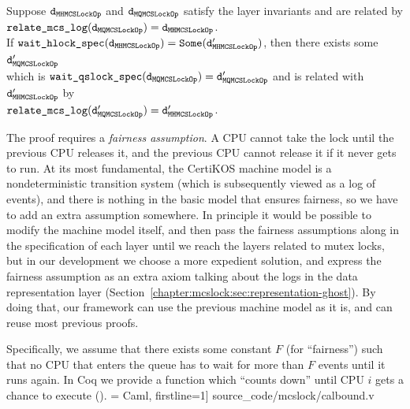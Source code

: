 \begin{theorem}
  \label{thm:chapter:mcslock:mcs_wait_lock_exist}

  Suppose ${\mathrm{\texttt{{d}}}}_{{\mathrm{\texttt{{MHMCSLockOp}}}}}$ and ${\mathrm{\texttt{{d}}}}_{{\mathrm{\texttt{{MQMCSLockOp}}}}}$ satisfy the layer
  invariants and are related by\\
   ${\mathrm{\texttt{{relate\_mcs\_log}}}}({\mathrm{\texttt{{d}}}}_{{\mathrm{\texttt{{{MQMCSLockOp}}}}}}) = 
  {\mathrm{\texttt{{d}}}}_{{\mathrm{\texttt{{MHMCSLockOp}}}}}$.\\
If ${\mathrm{\texttt{{wait\_hlock\_spec}}}}({\mathrm{\texttt{{d}}}}_{{\mathrm{\texttt{{MHMCSLockOp}}}}}) = {\mathrm{\texttt{{Some}}}}({\mathrm{\texttt{{d}}}}'_{{\mathrm{\texttt{{MHMCSLockOp}}}}})$, then there exists some ${\mathrm{\texttt{{d}}}}'_{{\mathrm{\texttt{{MQMCSLockOp}}}}}$\\
  which is ${\mathrm{\texttt{{wait\_qslock\_spec}}}}({\mathrm{\texttt{{d}}}}_{{\mathrm{\texttt{{MQMCSLockOp}}}}}) = {\mathrm{\texttt{{d}}}}'_{{\mathrm{\texttt{{MQMCSLockOp}}}}}$ and is related with ${\mathrm{\texttt{{d}}}}'_{{\mathrm{\texttt{{MHMCSLockOp}}}}}$
   by\\
 ${\mathrm{\texttt{{relate\_mcs\_log}}}}({\mathrm{\texttt{{d}}}}'_{{\mathrm{\texttt{{MQMCSLockOp}}}}}) = {\mathrm{\texttt{{d}}}}'_{{\mathrm{\texttt{{MHMCSLockOp}}}}}$.

\end{theorem}

The proof  requires a \emph{fairness assumption}.
A CPU cannot take the lock until the previous CPU releases it, 
and the previous CPU cannot release it if it never gets to run. 
At its most fundamental, the CertiKOS machine model is a nondeterministic 
transition system (which is subsequently viewed as a log of events), 
and there is nothing in the basic model that ensures fairness, 
so we have to add an extra assumption somewhere. In principle it would be 
possible to modify the machine model itself, and then pass the fairness assumptions 
along in the specification of each layer until we reach the layers related to mutex locks, 
but in our development we choose a more expedient solution, and express
the fairness assumption as an extra axiom talking about the logs 
in the data representation layer (Section~\ref{chapter:mcslock:sec:representation-ghost}). 
By doing that, our framework can use the previous machine 
model as it is, and can reuse most previous proofs.

Specifically, we assume that there exists some constant $F$ (for ``fairness'') such that no CPU that enters the queue has to wait for more than $F$ events until it runs again. 
In Coq we provide a function  which ``counts down'' 
until CPU $i$ gets a chance to 
execute ().
 = Caml, firstline=1] {source_code/mcslock/calbound.v}

